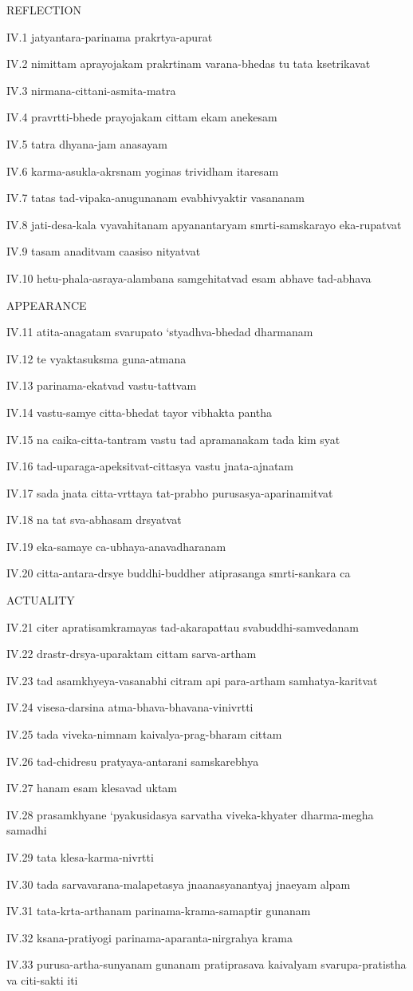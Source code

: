 REFLECTION

IV.1
jatyantara-parinama prakrtya-apurat

IV.2
nimittam aprayojakam prakrtinam varana-bhedas tu tata ksetrikavat

IV.3
nirmana-cittani-asmita-matra

IV.4
pravrtti-bhede prayojakam cittam ekam anekesam

IV.5
tatra dhyana-jam anasayam

IV.6
karma-asukla-akrsnam yoginas trividham itaresam

IV.7
tatas tad-vipaka-anugunanam evabhivyaktir vasananam

IV.8
jati-desa-kala vyavahitanam apyanantaryam smrti-samskarayo eka-rupatvat

IV.9
tasam anaditvam caasiso nityatvat

IV.10
hetu-phala-asraya-alambana samgehitatvad esam abhave tad-abhava

APPEARANCE

IV.11
atita-anagatam svarupato ‘styadhva-bhedad dharmanam

IV.12
te vyaktasuksma guna-atmana

IV.13
parinama-ekatvad vastu-tattvam

IV.14
vastu-samye citta-bhedat tayor vibhakta pantha

IV.15
na caika-citta-tantram vastu tad apramanakam tada kim syat

IV.16
tad-uparaga-apeksitvat-cittasya vastu jnata-ajnatam

IV.17
sada jnata citta-vrttaya tat-prabho purusasya-aparinamitvat

IV.18
na tat sva-abhasam drsyatvat

IV.19
eka-samaye ca-ubhaya-anavadharanam

IV.20
citta-antara-drsye buddhi-buddher atiprasanga smrti-sankara ca

ACTUALITY

IV.21
citer apratisamkramayas tad-akarapattau svabuddhi-samvedanam

IV.22
drastr-drsya-uparaktam cittam sarva-artham

IV.23
tad asamkhyeya-vasanabhi citram api para-artham samhatya-karitvat

IV.24
visesa-darsina atma-bhava-bhavana-vinivrtti

IV.25
tada viveka-nimnam kaivalya-prag-bharam cittam

IV.26
tad-chidresu pratyaya-antarani samskarebhya

IV.27
hanam esam klesavad uktam

IV.28
prasamkhyane ‘pyakusidasya sarvatha viveka-khyater dharma-megha samadhi

IV.29
tata klesa-karma-nivrtti

IV.30
tada sarvavarana-malapetasya jnaanasyanantyaj jnaeyam alpam

IV.31
tata-krta-arthanam parinama-krama-samaptir gunanam

IV.32
ksana-pratiyogi parinama-aparanta-nirgrahya krama

IV.33
purusa-artha-sunyanam gunanam pratiprasava kaivalyam
svarupa-pratistha va citi-sakti iti
